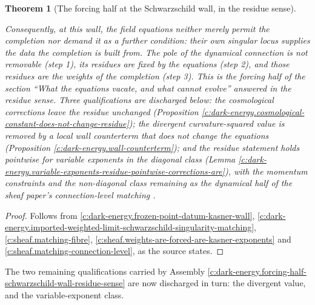 \documentclass[11pt]{article}
\newtheorem{theorem}{Theorem}[section]
\theoremstyle{definition}
\theoremstyle{plain}
\begin{document}
\begin{theorem}[The forcing half at the Schwarzschild wall, in the residue sense]
\begin{enumerate}
\end{enumerate}
Consequently, at this wall, the field equations neither merely permit the completion nor demand it as a further condition: their own singular locus supplies the data the completion is built from. The pole of the dynamical connection is not removable (step 1), its residues are fixed by the equations (step 2), and those residues are the weights of the completion (step 3). This is the forcing half of the section ``What the equations vacate, and what cannot evolve'' answered in the residue sense. Three qualifications are discharged below: the cosmological corrections leave the residue unchanged (Proposition \ref{c:dark-energy.cosmological-constant-does-not-change-residue}); the divergent curvature-squared \emph{value} is removed by a local wall counterterm that does not change the equations (Proposition \ref{c:dark-energy.wall-counterterm}); and the residue statement holds pointwise for variable exponents in the diagonal class (Lemma \ref{c:dark-energy.variable-exponents-residue-pointwise-corrections-are}), with the momentum constraints and the non-diagonal class remaining as the dynamical half of the sheaf paper's connection-level matching \cite[Rem.~8.28]{ButlerT4}.
\end{theorem}
\begin{proof}
Follows from \ref{c:dark-energy.frozen-point-datum-kasner-wall}, \ref{c:dark-energy.imported-weighted-limit-schwarzschild-singularity-matching}, \ref{c:sheaf.matching-fibre}, \ref{c:sheaf.weights-are-forced-are-kasner-exponents} and \ref{c:sheaf.matching-connection-level}, as the source states.

\end{proof}

\label{c:note.dark-energy.setting-interface-schwarzschild-wall-datum-has-2}
The two remaining qualifications carried by Assembly \ref{c:dark-energy.forcing-half-schwarzschild-wall-residue-sense} are now discharged in turn: the divergent value, and the variable-exponent class.
\end{document}
